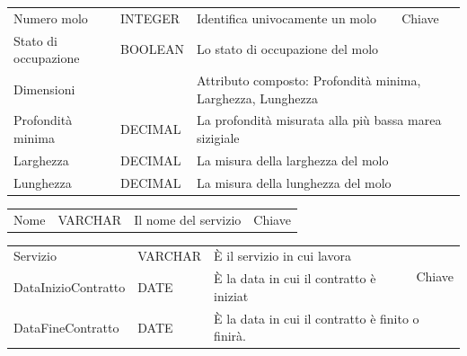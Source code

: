 \begin{center}
    \begin{tabularx}{\textwidth}{|l|l|l|X|}
        \hline
        \rowcolor{gray!30}
        \multicolumn{4}{|c|}{\textbf{Molo}}\\

        \hline
        Numero molo & INTEGER & Identifica univocamente un molo & Chiave\\
        \hline
        Stato di occupazione & BOOLEAN &\multicolumn{2}{l|}{ Lo stato di occupazione del molo}\\
        \hline
        Dimensioni &  & \multicolumn{2}{l|}{Attributo composto: Profondità minima, Larghezza, Lunghezza} \\
        \hline
        Profondità minima & DECIMAL & \multicolumn{2}{l|}{La profondità misurata alla più bassa marea sizigiale} \\
        \hline
        Larghezza & DECIMAL & \multicolumn{2}{l|}{La misura della larghezza del molo} \\
        \hline
        Lunghezza & DECIMAL & \multicolumn{2}{l|}{La misura della lunghezza del molo} \\
        \hline
    \end{tabularx}
\end{center}

\begin{center}
    \begin{tabularx}{\textwidth}{|l|l|l|X|}
        \hline
        \rowcolor{gray!30}
        \multicolumn{4}{|c|}{\textbf{Servizio}}\\
        \hline
        Nome & VARCHAR & Il nome del servizio & Chiave \\
        \hline
    \end{tabularx}
\end{center}


\begin{center}
    \begin{tabularx}{\textwidth}{|l|l|l|X|}
        \hline
        \rowcolor{gray!30}
        \multicolumn{4}{|c|}{\textbf{Addetto}}\\
        \hline
        Servizio & VARCHAR & È il servizio in cui lavora & \multirow{2}{*}{Chiave}\\
        \hhline{---}
        DataInizioContratto & DATE & È la data in cui il contratto è iniziat& \\
        \hline
        DataFineContratto & DATE &\multicolumn{2}{l|}{ È la data in cui il contratto è finito o finirà.}\\
        \hline
    \end{tabularx}
\end{center}

